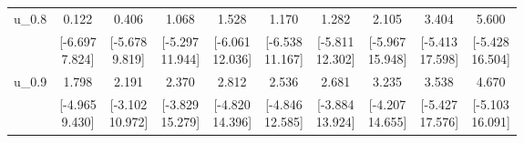 {\begin{tabular}{lccccccccc}
u\_0.8 & 0.122 & 0.406 & 1.068 & 1.528 & 1.170 & 1.282 & 2.105 & 3.404 & 5.600 \\
 & \shortstack{[-6.697\\7.824]} & \shortstack{[-5.678\\9.819]} & \shortstack{[-5.297\\11.944]} & \shortstack{[-6.061\\12.036]} & \shortstack{[-6.538\\11.167]} & \shortstack{[-5.811\\12.302]} & \shortstack{[-5.967\\15.948]} & \shortstack{[-5.413\\17.598]} & \shortstack{[-5.428\\16.504]} \\[0.25em]
u\_0.9 & 1.798 & 2.191 & 2.370 & 2.812 & 2.536 & 2.681 & 3.235 & 3.538 & 4.670 \\
 & \shortstack{[-4.965\\9.430]} & \shortstack{[-3.102\\10.972]} & \shortstack{[-3.829\\15.279]} & \shortstack{[-4.820\\14.396]} & \shortstack{[-4.846\\12.585]} & \shortstack{[-3.884\\13.924]} & \shortstack{[-4.207\\14.655]} & \shortstack{[-5.427\\17.576]} & \shortstack{[-5.103\\16.091]} \\[0.25em]
\bottomrule
\end{tabular}
}
